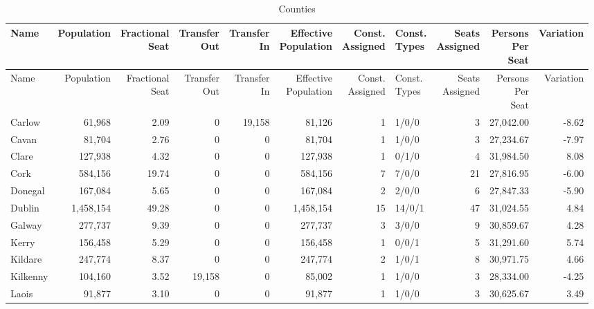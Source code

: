 \documentclass[a4paper]{article}
\begin{document}
\begin{longtable}{lrrrrrrlrrr}
\caption{Counties}
\\ \toprule
Name &Population &\shortstack{Fractional\\Seat} &\shortstack{Transfer\\Out} &\shortstack{Transfer\\In} &\shortstack{Effective\\Population} &\shortstack{Const.\\Assigned} &\shortstack{Const.\\Types} &\shortstack{Seats\\Assigned} &\shortstack{Persons\\Per\\Seat} &Variation \\ \midrule
\endfirsthead
\toprule
Name &Population &\shortstack{Fractional\\Seat} &\shortstack{Transfer\\Out} &\shortstack{Transfer\\In} &\shortstack{Effective\\Population} &\shortstack{Const.\\Assigned} &\shortstack{Const.\\Types} &\shortstack{Seats\\Assigned} &\shortstack{Persons\\Per\\Seat} &Variation \\ \midrule
\endhead
\bottomrule
\endfoot
Carlow&61,968& 2.09&0&19,158&81,126&1&1/0/0&3&27,042.00&-8.62\\ 
Cavan&81,704& 2.76&0&0&81,704&1&1/0/0&3&27,234.67&-7.97\\ 
Clare&127,938& 4.32&0&0&127,938&1&0/1/0&4&31,984.50& 8.08\\ 
Cork&584,156&19.74&0&0&584,156&7&7/0/0&21&27,816.95&-6.00\\ 
Donegal&167,084& 5.65&0&0&167,084&2&2/0/0&6&27,847.33&-5.90\\ 
Dublin&1,458,154&49.28&0&0&1,458,154&15&14/0/1&47&31,024.55& 4.84\\ 
Galway&277,737& 9.39&0&0&277,737&3&3/0/0&9&30,859.67& 4.28\\ 
Kerry&156,458& 5.29&0&0&156,458&1&0/0/1&5&31,291.60& 5.74\\ 
Kildare&247,774& 8.37&0&0&247,774&2&1/0/1&8&30,971.75& 4.66\\ 
Kilkenny&104,160& 3.52&19,158&0&85,002&1&1/0/0&3&28,334.00&-4.25\\ 
Laois&91,877& 3.10&0&0&91,877&1&1/0/0&3&30,625.67& 3.49\\ 

\end{longtable}
\end{document}

